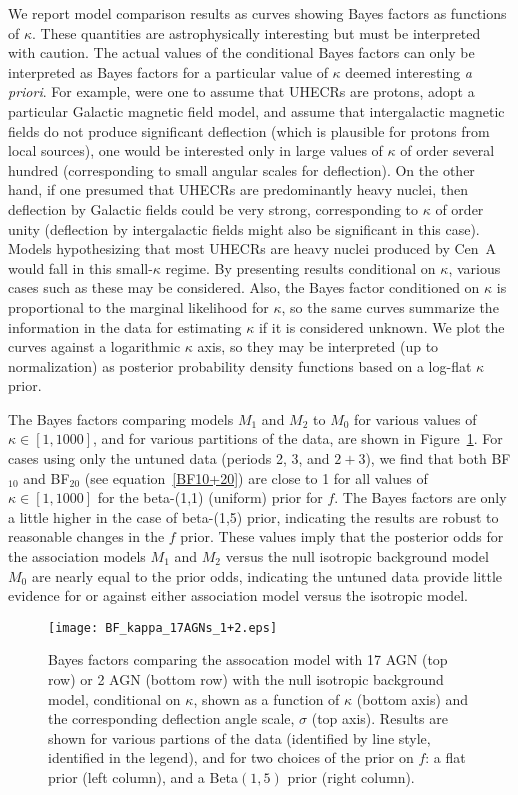 We report model comparison results as curves showing Bayes
factors as functions of $\kappa$.  These quantities are astrophysically
interesting but must be interpreted with caution.  The actual values of the
conditional Bayes factors can only be interpreted as Bayes factors for a
particular value of $\kappa$ deemed interesting {\em a priori}.  For example,
were one to assume that UHECRs are protons, adopt a particular Galactic
magnetic field model, and assume that intergalactic magnetic fields do not
produce significant deflection (which is plausible for protons from local
sources), one would be interested only in large values of $\kappa$ of order
several hundred (corresponding to small angular scales for deflection).  On
the other hand, if one presumed that UHECRs are predominantly heavy nuclei,
then deflection by Galactic fields could be very strong, corresponding to
$\kappa$ of order unity (deflection by intergalactic fields might also be
significant in this case).  Models hypothesizing that most UHECRs are
heavy nuclei produced by Cen~A would fall in this small-$\kappa$ regime.
By presenting results conditional on $\kappa$, various cases
such as these may be considered.  Also, the Bayes factor conditioned on
$\kappa$ is proportional to the marginal likelihood for $\kappa$, so the
same curves summarize the information in the data for estimating $\kappa$ if
it is considered unknown.  We plot the curves against a logarithmic $\kappa$
axis, so they may be interpreted (up to normalization) as posterior
probability density functions based on a log-flat $\kappa$ prior.

The Bayes factors comparing models $M_1$ and $M_2$ to $M_0$ for various values
of $\kappa\in[1,1000]$, and for various partitions of the data, are shown in
Figure~\ref{fig:BFplot}.  For cases using only the untuned data (periods 2, 3,
and $2+3$), we find that both BF$_{10}$ and BF$_{20}$ (see
equation~\ref{BF10+20}) are close to 1 for all values of $\kappa\in[1,1000]$
for the beta-(1,1) (uniform) prior for $f$.  The Bayes factors are only
a little higher in the case of beta-(1,5) prior, indicating the results
are robust to reasonable changes in the $f$ prior. These values imply
that the posterior odds for the association models $M_1$ and $M_2$
versus the null isotropic background model $M_0$ are nearly equal to the
prior odds, indicating the untuned data provide little evidence for or
against either association model versus the isotropic model.

\begin{figure}
\centerline{\texttt{[image: BF\_kappa\_17AGNs\_1+2.eps]}}
\caption{Bayes factors comparing the assocation model with 17 AGN (top row) or
2 AGN (bottom row) with the null isotropic background model, conditional
on $\kappa$, shown as a function of $\kappa$ (bottom axis) and the
corresponding deflection angle scale, $\sigma$ (top axis).  Results are
shown for various partions of the data (identified by line style,
identified in the legend), and for two choices of the prior on $f$: a
flat prior (left column), and a Beta$(1,5)$ prior (right column).}
\label{fig:BFplot}
\end{figure}

